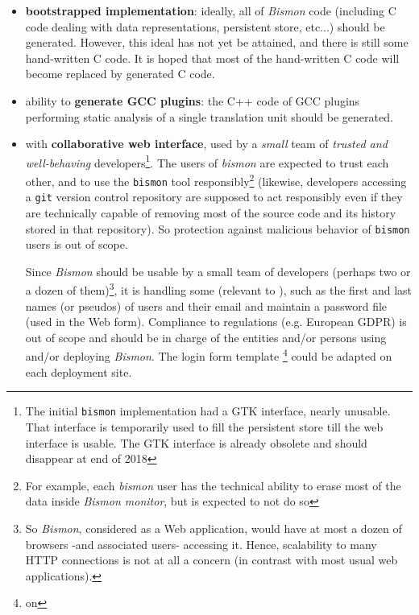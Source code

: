 \begin{itemize}
    \item \textbf{bootstrapped implementation}: ideally, all of
      \textit{Bismon} code (including C code dealing with data
      representations, persistent store, etc...) should be
      generated. However, this ideal has not yet be attained, and
      there is still some hand-written C code. It is hoped that most
      of the hand-written C code will become replaced by generated C
      code.
    \item ability to \textbf{generate GCC plugins}: the C++ code of
      GCC plugins performing static analysis of a single translation
      unit should be generated.

    \item with \textbf{collaborative web interface}, used by a
      \emph{small} team of \emph{trusted and well-behaving}
      developers\footnote{The initial \texttt{bismon} implementation
        had a GTK interface, nearly unusable. That interface is
        temporarily used to fill the persistent store till the web
        interface is usable. The GTK interface is already obsolete and
        should disappear at end of 2018}. The users of \emph{bismon}
      are expected to trust each other, and to use the \texttt{bismon}
      tool responsibly\footnote{For example, each \emph{bismon} user
        has the technical ability to erase most of the data inside
        \textit{Bismon monitor}, but is expected to not do so}
      (likewise, developers accessing a \texttt{git} version control
      repository are supposed to act responsibly even if they are
      technically capable of removing most of the source code and its
      history stored in that repository). So protection
      against malicious behavior of \texttt{bismon} users is out of
      scope.

      Since \textit{Bismon} should be usable by a small team of
      developers (perhaps two or a dozen of them)\footnote{So
        \textit{Bismon}, considered as a Web application, would have
        at most a dozen of browsers -and associated users- accessing
        it. Hence, scalability to many HTTP connections is not at all
        a concern (in contrast with most usual web applications).}, it
      is handling some  (relevant
      to ), such as the first and last names (or
      pseudos) of users and their email and maintain a password file
      (used in the Web  form). Compliance to
      regulations (e.g. European GDPR) is out of scope and should be
      in charge of the entities and/or persons using and/or deploying
      \textit{Bismon}. The login form template \footnote{on
        }
      could be adapted on each deployment site.
\end{itemize}

